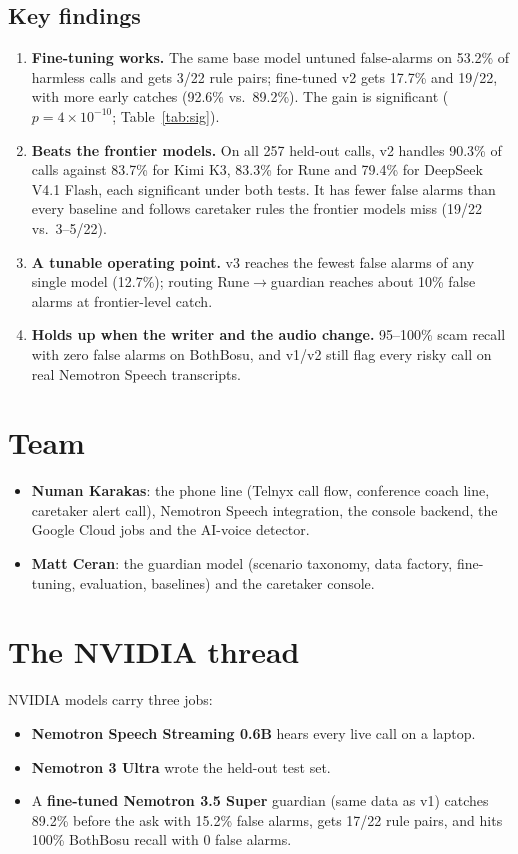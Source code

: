 \documentclass[11pt]{article}
\begin{document}
\subsection*{Key findings}
\begin{enumerate}
\item \textbf{Fine-tuning works.} The same base model untuned false-alarms on 53.2\% of harmless calls and gets 3/22 rule pairs; fine-tuned v2 gets 17.7\% and 19/22, with more early catches (92.6\% vs.\ 89.2\%). The gain is significant ($p = 4\times10^{-10}$; Table~\ref{tab:sig}).
\item \textbf{Beats the frontier models.} On all 257 held-out calls, v2 handles 90.3\% of calls against 83.7\% for Kimi K3, 83.3\% for Rune and 79.4\% for DeepSeek V4.1 Flash, each significant under both tests. It has fewer false alarms than every baseline and follows caretaker rules the frontier models miss (19/22 vs.\ 3--5/22).
\item \textbf{A tunable operating point.} v3 reaches the fewest false alarms of any single model (12.7\%); routing Rune$\rightarrow$guardian reaches about 10\% false alarms at frontier-level catch.
\item \textbf{Holds up when the writer and the audio change.} 95--100\% scam recall with zero false alarms on BothBosu, and v1/v2 still flag every risky call on real Nemotron Speech transcripts.
\end{enumerate}

\section{Team}
\begin{itemize}
\item \textbf{Numan Karakas}: the phone line (Telnyx call flow, conference coach line, caretaker alert call), Nemotron Speech integration, the console backend, the Google Cloud jobs and the AI-voice detector.
\item \textbf{Matt Ceran}: the guardian model (scenario taxonomy, data factory, fine-tuning, evaluation, baselines) and the caretaker console.
\end{itemize}

\section{The NVIDIA thread}
NVIDIA models carry three jobs:
\begin{itemize}
\item \textbf{Nemotron Speech Streaming 0.6B} hears every live call on a laptop.
\item \textbf{Nemotron 3 Ultra} wrote the held-out test set.
\item A \textbf{fine-tuned Nemotron 3.5 Super} guardian (same data as v1) catches 89.2\% before the ask with 15.2\% false alarms, gets 17/22 rule pairs, and hits 100\% BothBosu recall with 0 false alarms.
\end{itemize}
\end{document}
